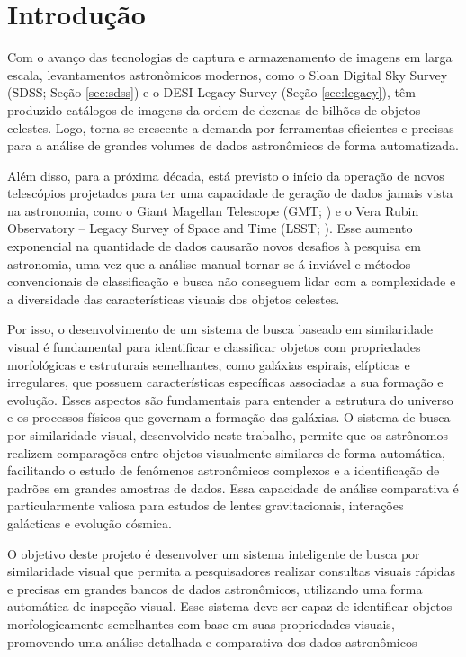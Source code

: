 \section{Introdução}
\label{cap:introducao}

Com o avanço das tecnologias de captura e armazenamento de imagens em larga escala, levantamentos astronômicos modernos, como o Sloan Digital Sky Survey (SDSS; Seção \ref{sec:sdss}) e o DESI Legacy Survey (Seção \ref{sec:legacy}), têm produzido catálogos de imagens da ordem de dezenas de bilhões de objetos celestes. Logo, torna-se crescente a demanda por ferramentas eficientes e precisas para a análise de grandes volumes de dados astronômicos de forma automatizada.

Além disso, para a próxima década, está previsto o início da operação de novos telescópios projetados para ter uma capacidade de geração de dados jamais vista na astronomia, como o Giant Magellan Telescope (GMT; \citealp{gmt}) e o Vera Rubin Observatory -- Legacy Survey of Space and Time (LSST; \citealp{lsst}). Esse aumento exponencial na quantidade de dados causarão novos desafios à pesquisa em astronomia, uma vez que a análise manual tornar-se-á inviável e métodos convencionais de classificação e busca não conseguem lidar com a complexidade e a diversidade das características visuais dos objetos celestes.

Por isso, o desenvolvimento de um sistema de busca baseado em similaridade visual é fundamental para identificar e classificar objetos com propriedades morfológicas e estruturais semelhantes, como galáxias espirais, elípticas e irregulares, que possuem características específicas associadas a sua formação e evolução. Esses aspectos são fundamentais para entender a estrutura do universo e os processos físicos que governam a formação das galáxias. O sistema de busca por similaridade visual, desenvolvido neste trabalho, permite que os astrônomos realizem comparações entre objetos visualmente similares de forma automática, facilitando o estudo de fenômenos astronômicos complexos e a identificação de padrões em grandes amostras de dados. Essa capacidade de análise comparativa é particularmente valiosa para estudos de lentes gravitacionais, interações galácticas e evolução cósmica.

O objetivo deste projeto é desenvolver um sistema inteligente de busca por similaridade visual que permita a pesquisadores realizar consultas visuais rápidas e precisas em grandes bancos de dados astronômicos, utilizando uma forma automática de inspeção visual. Esse sistema deve ser capaz de identificar objetos morfologicamente semelhantes com base em suas propriedades visuais, promovendo uma análise detalhada e comparativa dos dados astronômicos

